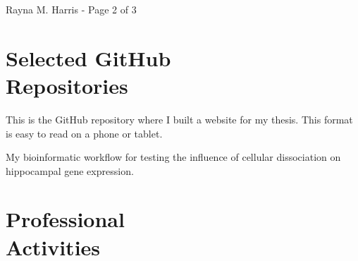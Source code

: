 \documentclass[margin,line]{CV}
\begin{document}
\begin{resume}
\vspace{0.4 cm}
{\centerline {Rayna M. Harris - Page 2 of 3}}
\newpage



\section{\mysidestyle Selected GitHub \\Repositories}

\begin{description}
\setlength{\itemsep}{1pt}

\item [\href{https://github.com/raynamharris/Thesis}{Thesis}] This is the GitHub repository where I built a website for my thesis. This format is easy to read on a phone or tablet.

\item [\href{https://github.com/raynamharris/DissociationTest}{DissociationTest}] My bioinformatic workflow for testing the influence of cellular dissociation on hippocampal gene expression.



\end{description}


    
\section{\mysidestyle Professional\\Activities}


\end{resume}
\end{document}

